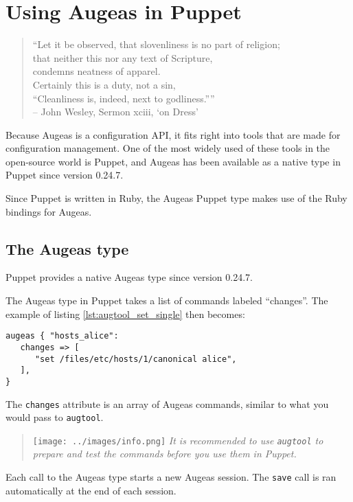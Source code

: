 \chapter{Using Augeas in Puppet}

\begin{verse}
``Let it be observed, that slovenliness is no part of religion; \\
that neither this nor any text of Scripture, \\
condemns neatness of apparel. \\
Certainly this is a duty, not a sin, \\
``Cleanliness is, indeed, next to godliness.'''' \\
\small{-- John Wesley, Sermon xciii, `on Dress'}
\end{verse}

Because Augeas is a configuration API, it fits right into tools that are made for configuration management. One of the most widely used of these tools in the open-source world is Puppet, and Augeas has been available as a native type in Puppet since version 0.24.7.

Since Puppet is written in Ruby, the Augeas Puppet type makes use of the Ruby bindings for Augeas.

\section{The Augeas type}

Puppet provides a native Augeas type since version 0.24.7.

 The Augeas type in Puppet takes a list of commands labeled ``changes''. The example of listing \ref{lst:augtool_set_single} then becomes:

\begin{verbatim}
augeas { "hosts_alice":
   changes => [
      "set /files/etc/hosts/1/canonical alice",
   ],
}
\end{verbatim}

The \verb!changes! attribute is an array of Augeas commands, similar to what you would pass to \verb!augtool!.

\begin{quote}
\texttt{[image: ../images/info.png]} \emph{It is recommended to use \texttt{augtool} to prepare and test the commands before you use them in Puppet.}

\end{quote}
 Each call to the Augeas type starts a new Augeas session. The \verb!save! call is ran automatically at the end of each session.

